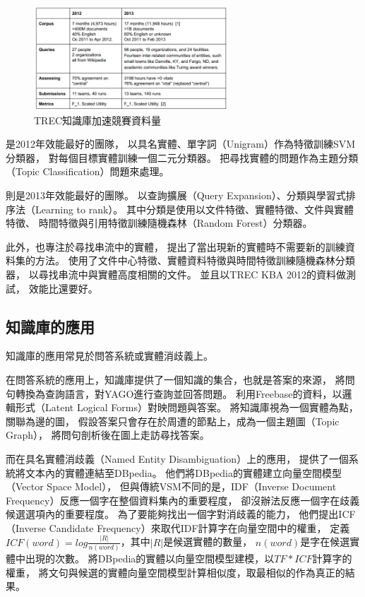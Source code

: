 \begin{figure}
    \centering
    \includegraphics[width=0.65\textwidth]{images/02-kba-corpus}
    \caption{TREC知識庫加速競賽資料量}
    \label{i:kba-corps}
\end{figure}

\cite{kba-hltoce}是2012年效能最好的團隊，
以具名實體、單字詞（Unigram）作為特徵訓練SVM分類器，
對每個目標實體訓練一個二元分類器。
把尋找實體的問題作為主題分類（Topic Classification）問題來處理。

\cite{kba-msra}則是2013年效能最好的團隊。
以查詢擴展（Query Expansion）、分類與學習式排序法（Learning to rank）。
其中分類是使用以文件特徵、實體特徵、文件與實體特徵、
時間特徵與引用特徵訓練隨機森林（Random Forest）分類器。

此外，\cite{kba-entity-detection}也專注於尋找串流中的實體，
提出了當出現新的實體時不需要新的訓練資料集的方法。
使用了文件中心特徵、實體資料特徵與時間特徵訓練隨機森林分類器，
以尋找串流中與實體高度相關的文件。
並且以TREC KBA 2012的資料做測試，
效能比\cite{kba-hltoce}還要好。

\subsection{知識庫的應用}

知識庫的應用常見於問答系統或實體消歧義上。

在問答系統的應用上，知識庫提供了一個知識的集合，也就是答案的來源，
\cite{yago-qa}將問句轉換為查詢語言，對YAGO進行查詢並回答問題。
\cite{freebase-qa-extract}利用Freebase的資料，以邏輯形式（Latent Logical Forms）對映問題與答案。
\cite{freebase-qa-parse}將知識庫視為一個實體為點，關聯為邊的圖，
假設答案只會存在於周遭的節點上，成為一個主題圖（Topic Graph），
將問句剖析後在圖上走訪尋找答案。

而在具名實體消歧義（Named Entity Disambiguation）上的應用，
\cite{dbpedia-spotlight} 提供了一個系統將文本內的實體連結至DBpedia。
他們將DBpedia的實體建立向量空間模型（Vector Space Model），
但與傳統VSM不同的是，IDF（Inverse Document Frequency）反應一個字在整個資料集內的重要程度，
卻沒辦法反應一個字在歧義候選選項內的重要程度。
為了要能夠找出一個字對消歧義的能力，
他們提出ICF（Inverse Candidate Frequency）來取代IDF計算字在向量空間中的權重，
定義$ICF(word) = log \frac{|R|}{n(word)}$，其中$|R|$是候選實體的數量，
$n(word)$是字在候選實體中出現的次數。
將DBpedia的實體以向量空間模型建模，以$TF*ICF$計算字的權重，
將文句與候選的實體向量空間模型計算相似度，取最相似的作為真正的結果。

